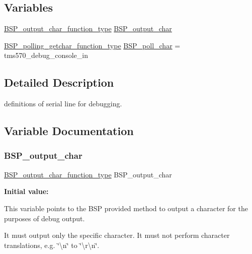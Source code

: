 \subsection*{Variables}
\begin{DoxyCompactItemize}
\item 
\mbox{\hyperlink{bspIo_8h_a0b0dff1c3d35110ae303b4098c60dc14}{B\+S\+P\+\_\+output\+\_\+char\+\_\+function\+\_\+type}} \mbox{\hyperlink{printk-support_8c_a5fb8c9c4f076f0340b4a17ed432ced5c}{B\+S\+P\+\_\+output\+\_\+char}}
\item 
\mbox{\hyperlink{bspIo_8h_a132b9ceff428a634ece5dfaac7ef1006}{B\+S\+P\+\_\+polling\+\_\+getchar\+\_\+function\+\_\+type}} \mbox{\hyperlink{printk-support_8c_ae5846eecdfa8f2813504371bf01c29b0}{B\+S\+P\+\_\+poll\+\_\+char}} = tms570\+\_\+debug\+\_\+console\+\_\+in
\end{DoxyCompactItemize}


\subsection{Detailed Description}
definitions of serial line for debugging. 



\subsection{Variable Documentation}
\mbox{\label{printk-support_8c_a5fb8c9c4f076f0340b4a17ed432ced5c}} 
\subsubsection{\texorpdfstring{BSP\_output\_char}{BSP\_output\_char}}
{\footnotesize\ttfamily \mbox{\hyperlink{bspIo_8h_a0b0dff1c3d35110ae303b4098c60dc14}{B\+S\+P\+\_\+output\+\_\+char\+\_\+function\+\_\+type}} B\+S\+P\+\_\+output\+\_\+char}

{\bfseries Initial value\+:}
\begin{DoxyCode}{0}
\DoxyCodeLine{=}

\end{DoxyCode}
This variable points to the B\+SP provided method to output a character for the purposes of debug output.

It must output only the specific character. It must not perform character translations, e.\+g. \char`\"{}\textbackslash{}n\char`\"{} to \char`\"{}\textbackslash{}r\textbackslash{}n\char`\"{}. \mbox{\label{printk-support_8c_ae5846eecdfa8f2813504371bf01c29b0}} 
